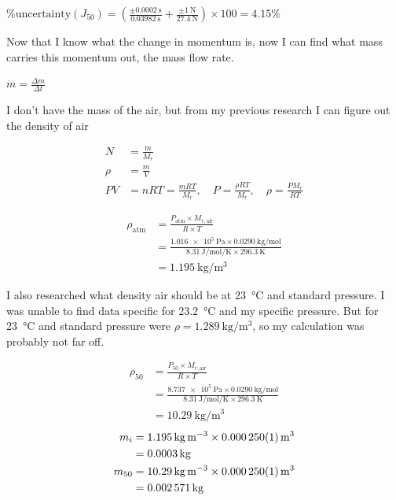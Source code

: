 \documentclass[12pt,a4paper]{article}
\begin{document}
$\%\text{uncertainty}(J_{50}) = \left(\frac{\pm \SI{0.0002}{\second}}{\SI{0.03982}{\second}} + \frac{\pm \SI{1}{\newton}}{\SI{27.4}{\newton}}\right) \times 100 = 4.15\%$

Now that I know what the change in momentum is, now I can find what mass carries this momentum out, the mass flow rate.

$\dot{m} = \frac{\Delta m}{\Delta t}$

I don't have the mass of the air, but from my previous research I can figure out the density of air

\begin{align}
N &= \frac{m}{M_r} \\
\rho &= \frac{m}{V} \\
PV &= nRT = \frac{mRT}{M_r}, \quad P = \frac{\rho RT}{M_r}, \quad \rho = \frac{PM_r}{RT}
\end{align}

\begin{align}
\rho_{\text{atm}} &= \frac{P_{\text{atm}} \times M_{r,\text{air}}}{R \times T} \\
&= \frac{\SI{1.016e5}{\pascal} \times \SI{0.0290}{\kilo\gram\per\mol}}{\SI{8.31}{\joule\per\mol\per\kelvin} \times \SI{296.3}{\kelvin}} \\
&= \SI{1.195}{\kilo\gram\per\meter\cubed}
\end{align}

I also researched what density air should be at \SI{23}{\celsius} and standard pressure. I was unable to find data specific for \SI{23.2}{\celsius} and my specific pressure. But for \SI{23}{\celsius} and standard pressure were $\rho = \SI{1.289}{\kilo\gram\per\meter\cubed}$, so my calculation was probably not far off.

\begin{align}
\rho_{50} &= \frac{P_{50} \times M_{r,\text{air}}}{R \times T} \\
&= \frac{\SI{8.737e5}{\pascal} \times \SI{0.0290}{\kilo\gram\per\mol}}{\SI{8.31}{\joule\per\mol\per\kelvin} \times \SI{296.3}{\kelvin}} \\
&= \SI{10.29}{\kilo\gram\per\meter\cubed}
\end{align}
\begin{align}
m_i &= \SI{1.195}{\kilo\gram\per\meter\cubed} \times \SI{0.000250 \pm 0.000001}{\meter\cubed} \\
&= \SI{0.0003}{\kilo\gram} \\
m_{50} &= \SI{10.29}{\kilo\gram\per\meter\cubed} \times \SI{0.000250 \pm 0.000001}{\meter\cubed} \\
&= \SI{0.002571}{\kilo\gram}
\end{align}
\end{document}
